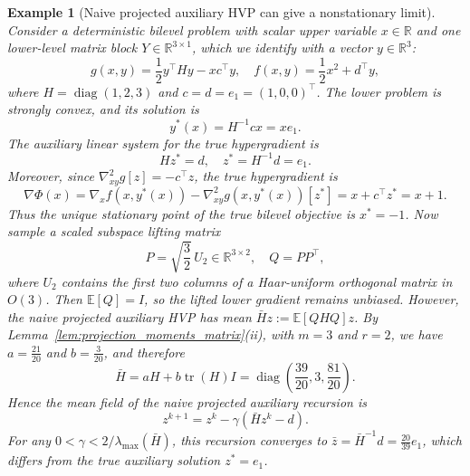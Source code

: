 \documentclass{pkumelon}
\theoremstyle{plain}
\newtheorem{example}{Example}
\newcommand{\R}{\mathbb{R}}
\newcommand{\E}{\mathbb{E}}
\begin{document}
\begin{example}[Naive projected auxiliary HVP can give a nonstationary limit]
\label{ex:naive_projected_hvp_counterexample}
Consider a deterministic bilevel problem with scalar upper variable $x\in\R$ and one lower-level matrix block $Y\in\R^{3\times 1}$, which we identify with a vector $y\in\R^3$:
\begin{equation*}
g(x,y)=\frac{1}{2}y^\top H y-xc^\top y, \quad f(x,y)=\frac{1}{2}x^2+d^\top y,
\end{equation*}
where $H=\operatorname{diag}(1,2,3)$ and $c=d=e_1=(1,0,0)^\top$. The lower problem is strongly convex, and its solution is
\begin{equation*}
y^*(x)=H^{-1}cx=xe_1.
\end{equation*}
The auxiliary linear system for the true hypergradient is
\begin{equation*}
Hz^*=d, \quad z^*=H^{-1}d=e_1.
\end{equation*}
Moreover, since $\nabla_{xy}^2g[z]=-c^\top z$, the true hypergradient is
\begin{equation*}
\nabla\Phi(x)=\nabla_x f(x,y^*(x))-\nabla_{xy}^2g(x,y^*(x))[z^*]=x+c^\top z^*=x+1.
\end{equation*}
Thus the unique stationary point of the true bilevel objective is $x^*=-1$.
Now sample a scaled subspace lifting matrix
\begin{equation*}
P=\sqrt{\frac{3}{2}}\,U_2\in\R^{3\times 2}, \quad Q=PP^\top,
\end{equation*}
where $U_2$ contains the first two columns of a Haar-uniform orthogonal matrix in $O(3)$. Then $\E[Q]=I$, so the lifted lower gradient remains unbiased. However, the naive projected auxiliary HVP has mean $\bar H z:=\E[QHQ]z$. By Lemma~\ref{lem:projection_moments_matrix}(ii), with $m=3$ and $r=2$, we have $a=\frac{21}{20}$ and $b=\frac{3}{20}$, and therefore
\begin{equation*}
\bar H=aH+b\operatorname{tr}(H)I=\operatorname{diag}\left(\frac{39}{20},3,\frac{81}{20}\right).
\end{equation*}
Hence the mean field of the naive projected auxiliary recursion is
\begin{equation*}
z^{k+1}=z^k-\gamma(\bar H z^k-d).
\end{equation*}
For any $0<\gamma<2/\lambda_{\max}(\bar H)$, this recursion converges to $\bar z=\bar H^{-1}d=\frac{20}{39}e_1$, which differs from the true auxiliary solution $z^*=e_1$.


\end{example}
\end{document}
